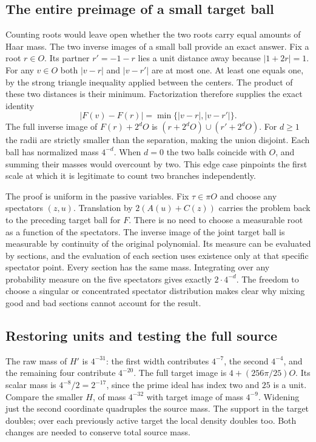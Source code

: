 \documentclass[12pt,letterpaper]{article}
\begin{document}
\subsection{The entire preimage of a small target ball}
Counting roots would leave open whether the two roots carry equal amounts of Haar mass. The two inverse images of a small ball provide an exact answer. Fix a root $r\in O$. Its partner $r'=-1-r$ lies a unit distance away because $|1+2r|=1$. For any $v\in O$ both $|v-r|$ and $|v-r'|$ are at most one. At least one equals one, by the strong triangle inequality applied between the centers. The product of these two distances is their minimum. Factorization therefore supplies the exact identity
\[
 |F(v)-F(r)|=\min\{|v-r|,|v-r'|\}.
\]
The full inverse image of $F(r)+2^dO$ is $(r+2^dO)\cup(r'+2^dO)$. For $d\ge1$ the radii are strictly smaller than the separation, making the union disjoint. Each ball has normalized mass $4^{-d}$. When $d=0$ the two balls coincide with $O$, and summing their masses would overcount by two. This edge case pinpoints the first scale at which it is legitimate to count two branches independently.

The proof is uniform in the passive variables. Fix $\tau\in\pi O$ and choose any spectators $(z,u)$. Translation by $2(A(u)+C(z))$ carries the problem back to the preceding target ball for $F$. There is no need to choose a measurable root as a function of the spectators. The inverse image of the joint target ball is measurable by continuity of the original polynomial. Its measure can be evaluated by sections, and the evaluation of each section uses existence only at that specific spectator point. Every section has the same mass. Integrating over any probability measure on the five spectators gives exactly $2\cdot4^{-d}$. The freedom to choose a singular or concentrated spectator distribution makes clear why mixing good and bad sections cannot account for the result.

\subsection{Restoring units and testing the full source}
The raw mass of $H'$ is $4^{-31}$: the first width contributes $4^{-7}$, the second $4^{-4}$, and the remaining four contribute $4^{-20}$. The full target image is $4+(256\pi/25)O$. Its scalar mass is $4^{-8}/2=2^{-17}$, since the prime ideal has index two and $25$ is a unit. Compare the smaller $H$, of mass $4^{-32}$ with target image of mass $4^{-9}$. Widening just the second coordinate quadruples the source mass. The support in the target doubles; over each previously active target the local density doubles too. Both changes are needed to conserve total source mass.
\end{document}
